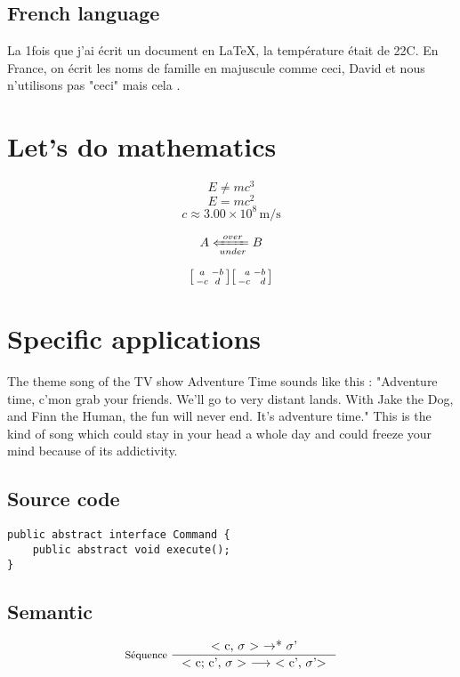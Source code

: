 \documentclass[11pt]{scrartcl}
\begin{document}
\subsection{French language}
La 1\iere fois que j'ai écrit un document en \LaTeX, la température était de 22\degres C. En France, on écrit les noms de famille en majuscule comme ceci,  David et nous n'utilisons pas "ceci" mais \og cela \fg.

%
%
\section{Let's do mathematics}
\begin{equation}
E \neq m c^3
\end{equation}
\begin{equation}
E = m c^2
\end{equation}
\begin{equation}
c \approx 3.00\times 10^{8}\,\mathrm{m}/\mathrm{s}
\end{equation}

\[
A \xLeftarrow[under]{over} B
\]

\[
\begin{bsmallmatrix}a & -b \\ -c & d \end{bsmallmatrix}
\begin{bsmallmatrix*}[r] a & -b \\ -c & d \end{bsmallmatrix*}
\]

%
%
\section{Specific applications}

\begin{multicols}{2}
The theme song of the TV show Adventure Time sounds like this : "Adventure time, c'mon grab your friends. We'll go to very distant lands. With Jake the Dog, and Finn the Human, the fun will never end. It's adventure time." This is the kind of song which could stay in your head a whole day and could freeze your mind because of its addictivity.
\end{multicols}

\subsection{Source code}
\begin{lstlisting}[caption=Interface \textit{Command}]
public abstract interface Command {
	public abstract void execute();
}
\end{lstlisting}

\subsection{Semantic}
\begin{align*}
\inference[Séquence ]
  { $< c, $\sigma$ > $->${*} $\sigma$'$ }
  { $< c; c', $\sigma$ > $-->$ < c', $\sigma$'>$}
\end{align*}
\end{document}
